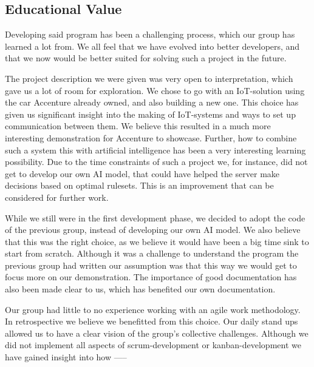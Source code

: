 \subsection{Educational Value}
Developing said program has been a challenging process, which our group has learned a lot from. We all feel that we have evolved into better developers, and that we now would be better suited for solving such a project in the future. 

The project description we were given was very open to interpretation, which gave us a lot of room for exploration. We chose to go with an IoT-solution using the car Accenture already owned, and also building a new one. This choice has given us significant insight into the making of IoT-systems and ways to set up communication between them. We believe this resulted in a much more interesting demonstration for Accenture to showcase. Further, how to combine such a system this with artificial intelligence has been a very interesting learning possibility. Due to the time constraints of such a project we, for instance, did not get to develop our own AI model, that could have helped the server make decisions based on optimal rulesets. This is an improvement that can be considered for further work. 

While we still were in the first development phase, we decided to adopt the code of the previous group, instead of developing our own AI model. We also believe that this was the right choice, as we believe it would have been a big time sink to start from scratch. Although it was a challenge to understand the program the previous group had written our assumption was that this way we would get to focus more on our demonstration. The importance of good documentation has also been made clear to us, which has benefited our own documentation. 

Our group had little to no experience working with an agile work methodology. In retrospective we believe we benefitted from this choice. Our daily stand ups allowed us to have a clear vision of the group's collective challenges. Although we did not implement all aspects of scrum-development or kanban-development we have gained insight into how -----